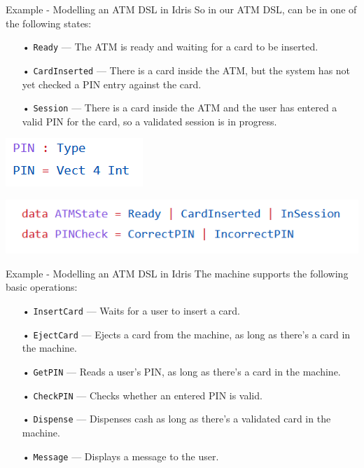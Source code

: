 \documentclass{beamer}
\newcommand{\dsltitle}{Example - Modelling an ATM DSL in Idris}
\begin{document}
\begin{frame}[fragile]{\dsltitle}
So in our ATM DSL, can be in one of the following states:
\begin{enumerate}
\item[•] \texttt{Ready} — The ATM is ready and waiting for a card to be inserted.
\item[•] \texttt{CardInserted} — There is a card inside the ATM, but the system has not yet checked a PIN entry against the card.
\item[•] \texttt{Session} — There is a card inside the ATM and the user has entered a valid PIN for the card, so a validated session is in progress.
\end{enumerate}
\begin{center}
	\includegraphics[scale=0.7]{dsl-code-0}
\end{center}
\begin{center}
	\includegraphics[scale=0.7]{dsl-code-1}
\end{center}
\end{frame}

\begin{frame}[fragile]{\dsltitle}
The machine supports the following basic operations:
\begin{enumerate}
\item[•] \texttt{InsertCard} — Waits for a user to insert a card.
\item[•] \texttt{EjectCard} — Ejects a card from the machine, as long as there’s a card in the machine.
\item[•] \texttt{GetPIN} — Reads a user’s PIN, as long as there’s a card in the machine.
\item[•] \texttt{CheckPIN} — Checks whether an entered PIN is valid.
\item[•] \texttt{Dispense} — Dispenses cash as long as there’s a validated card in the machine.
\item[•] \texttt{Message} — Displays a message to the user.
\end{enumerate}
\end{frame}
\end{document}
